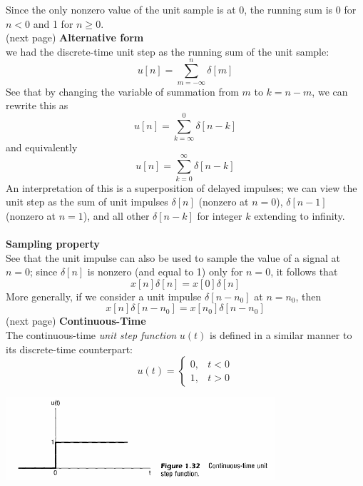 \documentclass{report}
\begin{document}
Since the only nonzero value of the unit sample is at 0, the running sum is 0 for $n<0$ and 1 for $n\geq0$.\\
(next page)\newpage
\noindent\textbf{Alternative form}\\
we had the discrete-time unit step as the running sum of the unit sample:
\begin{equation*}
u[n]=\sum^n_{m=-\infty}\delta[m]
\end{equation*}
See that by changing the variable of summation from $m$ to $k=n-m$, we can rewrite this as
\begin{equation*}
u[n]=\sum^0_{k=\infty}\delta[n-k]
\end{equation*}
and equivalently
\begin{equation*}
u[n]=\sum^\infty_{k=0}\delta[n-k]
\end{equation*}
An interpretation of this is a superposition of delayed impulses; we can view the unit step as the sum of unit impulses $\delta[n]$
(nonzero at $n=0$), $\delta[n-1]$ (nonzero at $n=1$), and all other $\delta[n-k]$ for integer $k$ extending to infinity.\\
\vspace{1mm}\\
\textbf{Sampling property}\\
See that the unit impulse can also be used to sample the value of a signal at $n=0$; since $\delta[n]$ is nonzero (and equal to 1)
only for $n=0$, it follows that
\begin{equation*}
x[n]\delta[n]=x[0]\delta[n]
\end{equation*}
More generally, if we consider a unit impulse $\delta[n-n_0]$ at $n=n_0$, then
\begin{equation*}
x[n]\delta[n-n_0]=x[n_0]\delta[n-n_0]
\end{equation*}
(next page)\newpage
\noindent\textbf{Continuous-Time}\\
The continuous-time \textit{unit step function} $u(t)$ is defined in a similar manner to its discrete-time counterpart:
\begin{equation*}
u(t)=\begin{cases}0,&t<0\\
1,&t>0\end{cases}
\end{equation*}
\begin{center}
\includegraphics[width=10cm]{a9}
\end{center}
\end{document}
